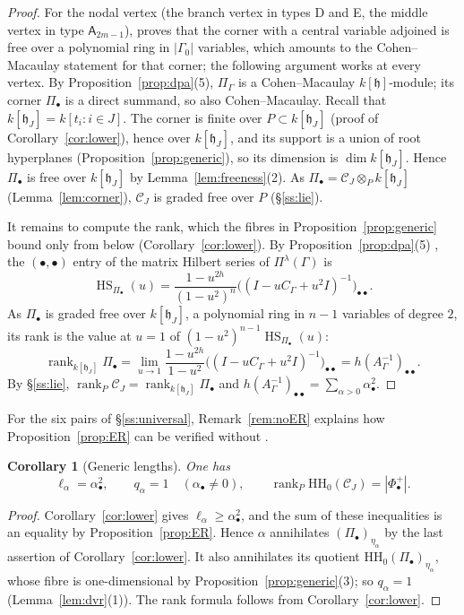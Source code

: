 \documentclass[11pt]{amsart}
\numberwithin{table}{section}
\numberwithin{figure}{section}
\numberwithin{equation}{section}
\newtheorem{cor}[thm]{Corollary}
\theoremstyle{definition}
\theoremstyle{plain}
\newcommand{\cC}{\mathcal{C}}
\newcommand{\h}{\mathfrak{h}}
\newcommand{\bul}{\bullet}
\newcommand{\HH}{\mathrm{HH}}
\DeclareMathOperator{\rank}{rank}
\begin{document}
\begin{proof}
For the nodal vertex (the branch vertex in types D and E, the middle vertex in type $\mathsf{A}_{2m-1}$), \cite[Thm~3.3(i)]{ER} proves that the corner with a central variable adjoined is free over a polynomial ring in $|\Gamma_0|$ variables, which amounts to the Cohen--Macaulay statement for that corner; the following argument works at every vertex. By Proposition~\ref{prop:dpa}(5), $\Pi_\Gamma$ is a Cohen--Macaulay $k[\h]$-module; its corner $\Pi_\bul$ is a direct summand, so also Cohen--Macaulay. Recall that $k[\h_J] = k[t_i : i \in J]$. The corner is finite over $P \subset k[\h_J]$ (proof of Corollary~\ref{cor:lower}), hence over $k[\h_J]$, and its support is a union of root hyperplanes (Proposition~\ref{prop:generic}), so its dimension is $\dim k[\h_J]$. Hence $\Pi_\bul$ is free over $k[\h_J]$ by Lemma~\ref{lem:freeness}(2). As $\Pi_\bul = \cC_J \otimes_P k[\h_J]$ (Lemma~\ref{lem:corner}), $\cC_J$ is graded free over $P$ (\S\ref{ss:lie}).

It remains to compute the rank, which the fibres in Proposition~\ref{prop:generic} bound only from below (Corollary~\ref{cor:lower}). By Proposition~\ref{prop:dpa}(5) \cite[\S2.1, Thm~3.1(ii)]{ER}, the $(\bul, \bul)$ entry of the matrix Hilbert series of $\Pi^\lambda(\Gamma)$ is
\[
\operatorname{HS}_{\Pi_\bul}(u)
=\frac{1-u^{2h}}{(1-u^2)^{n}}
\bigl((I-uC_\Gamma+u^2I)^{-1}\bigr)_{\bul\bul}.
\]
As $\Pi_\bul$ is graded free over $k[\h_J]$, a polynomial ring in $n - 1$ variables of degree $2$, its rank is the value at $u = 1$ of $(1-u^2)^{n-1}\operatorname{HS}_{\Pi_\bul}(u)$:
\[
\rank_{k[\h_J]}\Pi_\bul
=\lim_{u\to1}\frac{1-u^{2h}}{1-u^2}
\bigl((I-uC_\Gamma+u^2I)^{-1}\bigr)_{\bul\bul}
=h(A_\Gamma^{-1})_{\bul\bul}.
\]
By \S\ref{ss:lie}, $\rank_P\cC_J=\rank_{k[\h_J]}\Pi_\bul$ and $h(A_\Gamma^{-1})_{\bul\bul} = \sum_{\alpha>0}\alpha_\bul^2$.
\end{proof}

For the six pairs of \S\ref{ss:universal}, Remark~\ref{rem:noER} explains how Proposition~\ref{prop:ER} can be verified without \cite{ER}.

\begin{cor}[Generic lengths]\label{cor:trace-generic}
One has
\[
\ell_\alpha=\alpha_\bul^2,\qquad q_\alpha=1
\quad(\alpha_\bul\ne0),\qquad \rank_P \HH_0(\cC_J)=|\Phi^+_\bul|.
\]
\end{cor}

\begin{proof}
Corollary~\ref{cor:lower} gives $\ell_\alpha\ge\alpha_\bul^2$, and the sum of these inequalities is an equality by Proposition~\ref{prop:ER}. Hence $\alpha$ annihilates $(\Pi_\bul)_{\eta_\alpha}$ by the last assertion of Corollary~\ref{cor:lower}. It also annihilates its quotient $\HH_0(\Pi_\bul)_{\eta_\alpha}$, whose fibre is one-dimensional by Proposition~\ref{prop:generic}(3); so $q_\alpha=1$ (Lemma~\ref{lem:dvr}(1)). The rank formula follows from Corollary~\ref{cor:lower}.
\end{proof}
\end{document}
